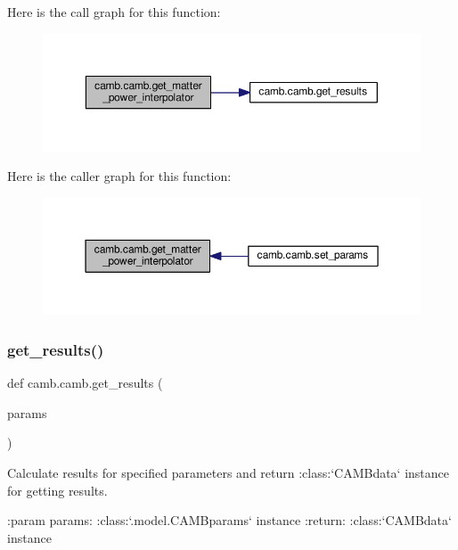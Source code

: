 Here is the call graph for this function\+:
\nopagebreak
\begin{figure}[H]
\begin{center}
\leavevmode
\includegraphics[width=350pt]{namespacecamb_1_1camb_a1418924a33e3086804b351674832636c_cgraph}
\end{center}
\end{figure}
Here is the caller graph for this function\+:
\nopagebreak
\begin{figure}[H]
\begin{center}
\leavevmode
\includegraphics[width=350pt]{namespacecamb_1_1camb_a1418924a33e3086804b351674832636c_icgraph}
\end{center}
\end{figure}
\mbox{\label{namespacecamb_1_1camb_a7e83f6bc935783f6948a0e9c4a9d9ed1}} 
\subsubsection{\texorpdfstring{get\+\_\+results()}{get\_results()}}
{\footnotesize\ttfamily def camb.\+camb.\+get\+\_\+results (\begin{DoxyParamCaption}\item[{}]{params }\end{DoxyParamCaption})}

\begin{DoxyVerb}Calculate results for specified parameters and return :class:`CAMBdata` instance for getting results.

:param params: :class:`.model.CAMBparams` instance
:return: :class:`CAMBdata` instance
\end{DoxyVerb}
 

